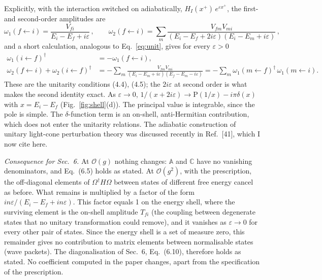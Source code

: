 \documentclass[11pt,a4paper]{article}
\begin{document}
Explicitly, with the interaction switched on adiabatically, $H_I(x^+)\,e^{\varepsilon x^+}$, the first- and second-order amplitudes are
\begin{equation}
\omega_1(f\!\leftarrow\! i)=\frac{V_{fi}}{E_i-E_f+i\varepsilon}\,,\qquad
\omega_2(f\!\leftarrow\! i)=\sum_m\frac{V_{fm}V_{mi}}{(E_i-E_f+2i\varepsilon)(E_i-E_m+i\varepsilon)}\,,
\label{eq:ieps}
\end{equation}
and a short calculation, analogous to Eq.~\eqref{eq:unit}, gives for every $\varepsilon>0$
\begin{align*}
\omega_1(i\!\leftarrow\! f)^\dagger&=-\omega_1(f\!\leftarrow\! i),\\
\omega_2(f\!\leftarrow\! i)+\omega_2(i\!\leftarrow\! f)^\dagger&=-\sum_m\frac{V_{fm}V_{mi}}{(E_i-E_m+i\varepsilon)(E_f-E_m-i\varepsilon)}=-\sum_m\omega_1(m\!\leftarrow\! f)^\dagger\,\omega_1(m\!\leftarrow\! i).
\end{align*}
These are the unitarity conditions (4.4), (4.5); the $2i\varepsilon$ at second order is what makes the second identity exact. As $\varepsilon\to0$, $1/(x+2i\varepsilon)\to\mathrm P(1/x)-i\pi\delta(x)$ with $x=E_i-E_f$ (Fig.~\ref{fig:shell}(d)). The principal value is integrable, since the pole is simple. The $\delta$-function term is an on-shell, anti-Hermitian contribution, which does not enter the unitarity relations. The adiabatic construction of unitary light-cone perturbation theory was discussed recently in Ref.~[41], which I now cite here.

\emph{Consequence for Sec.~6.} At $\mathcal O(g)$ nothing changes: $\mathbb A$ and $\mathbb C$ have no vanishing denominators, and Eq.~(6.5) holds as stated. At $\mathcal O(g^2)$, with the prescription, the off-diagonal elements of $\Omega^\dagger H\Omega$ between states of different free energy cancel as before. What remains is multiplied by a factor of the form $in\varepsilon/(E_i-E_f+in\varepsilon)$. This factor equals 1 on the energy shell, where the surviving element is the on-shell amplitude $T_{fi}$ (the coupling between degenerate states that no unitary transformation could remove), and it vanishes as $\varepsilon\to0$ for every other pair of states. Since the energy shell is a set of measure zero, this remainder gives no contribution to matrix elements between normalisable states (wave packets). The diagonalisation of Sec.~6, Eq.~(6.10), therefore holds as stated. No coefficient computed in the paper changes, apart from the specification of the prescription.
\end{document}
